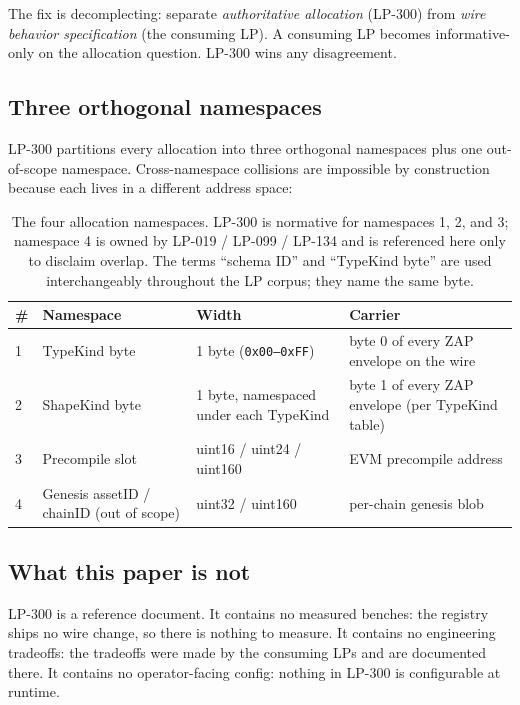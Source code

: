 The fix is decomplecting: separate \emph{authoritative allocation}
(LP-300) from \emph{wire behavior specification} (the consuming LP).
A consuming LP becomes informative-only on the allocation question.
LP-300 wins any disagreement.

\subsection{Three orthogonal namespaces}

LP-300 partitions every allocation into three orthogonal namespaces
plus one out-of-scope namespace. Cross-namespace collisions are
impossible by construction because each lives in a different address
space:

\begin{table}[h]
\centering
\small
\begin{tabular}{@{}lp{3.6cm}p{2.8cm}p{4.4cm}@{}}
\toprule
\textbf{\#} & \textbf{Namespace} & \textbf{Width} & \textbf{Carrier} \\
\midrule
1 & TypeKind byte & 1 byte (\texttt{0x00--0xFF}) & byte 0 of every ZAP envelope on the wire \\
2 & ShapeKind byte & 1 byte, namespaced under each TypeKind & byte 1 of every ZAP envelope (per TypeKind table) \\
3 & Precompile slot & uint16 / uint24 / uint160 & EVM precompile address \\
4 & Genesis assetID / chainID (out of scope) & uint32 / uint160 & per-chain genesis blob \\
\bottomrule
\end{tabular}
\caption{The four allocation namespaces. LP-300 is normative for
namespaces 1, 2, and 3; namespace 4 is owned by LP-019 / LP-099 /
LP-134 and is referenced here only to disclaim overlap. The terms
``schema ID'' and ``TypeKind byte'' are used interchangeably
throughout the LP corpus; they name the same byte.}
\label{tab:namespaces}
\end{table}

\subsection{What this paper is not}

LP-300 is a reference document. It contains no measured benches:
the registry ships no wire change, so there is nothing to measure.
It contains no engineering tradeoffs: the tradeoffs were made by
the consuming LPs and are documented there. It contains no
operator-facing config: nothing in LP-300 is configurable at
runtime.

